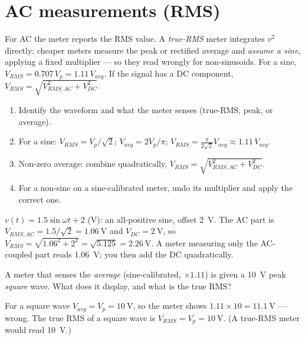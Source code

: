 \documentclass[11pt,a4paper,oneside]{book}
\begin{document}
\section{AC measurements (RMS)}
For AC the meter reports the RMS value. A \emph{true-RMS} meter integrates
$v^2$ directly; cheaper meters measure the peak or rectified average and
\emph{assume a sine}, applying a fixed multiplier --- so they read wrongly for
non-sinusoids. For a sine, $V_{RMS}=0.707\,V_p=1.11\,V_{avg}$. If the signal has a
DC component, $V_{RMS}=\sqrt{V_{RMS,AC}^2+V_{DC}^2}$.

\begin{protocol}
\begin{enumerate}[leftmargin=1.5cm]
  \item Identify the waveform and what the meter senses (true-RMS, peak, or
        average).
  \item For a sine: $V_{RMS}=V_p/\sqrt2$; $V_{avg}=2V_p/\pi$;
        $V_{RMS}=\frac{\pi}{2\sqrt2}V_{avg}\approx1.11\,V_{avg}$.
  \item Non-zero average: combine quadratically,
        $V_{RMS}=\sqrt{V_{RMS,AC}^2+V_{DC}^2}$.
  \item For a non-sine on a sine-calibrated meter, undo its multiplier and apply
        the correct one.
\end{enumerate}
\end{protocol}

\begin{wexample}
$v(t)=1.5\sin\omega t+2$ (V): an all-positive sine, offset \qty{2}{\volt}. The AC
part is $V_{RMS,AC}=1.5/\sqrt2=\qty{1.06}{\volt}$ and $V_{DC}=\qty{2}{\volt}$, so
$V_{RMS}=\sqrt{1.06^2+2^2}=\sqrt{5.125}=\qty{2.26}{\volt}$. A meter measuring only
the AC-coupled part reads \qty{1.06}{\volt}; you then add the DC quadratically.
\end{wexample}

\begin{exercise}
A meter that senses the \emph{average} (sine-calibrated, $\times1.11$) is given a
\qty{10}{\volt} peak \emph{square} wave. What does it display, and what is the true
RMS?
\end{exercise}
\begin{solution}
For a square wave $V_{avg}=V_p=\qty{10}{\volt}$, so the meter shows
$1.11\times10=\qty{11.1}{\volt}$ --- wrong. The true RMS of a square wave is
$V_{RMS}=V_p=\qty{10}{\volt}$. (A true-RMS meter would read \qty{10}{\volt}.)
\end{solution}
\end{document}
